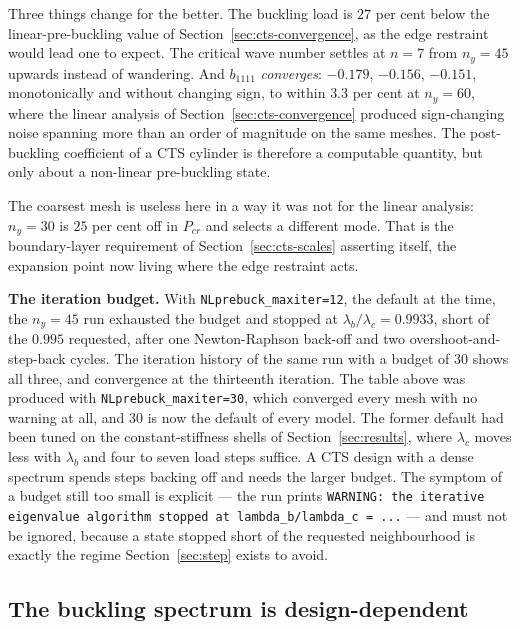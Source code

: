 \documentclass[11pt,a4paper]{article}
\begin{document}
Three things change for the better.  The buckling load is $27$ per cent below
the linear-pre-buckling value of Section~\ref{sec:cts-convergence}, as the
edge restraint would lead one to expect.  The critical wave number settles at
$n = 7$ from $n_y = 45$ upwards instead of wandering.  And $b_{1111}$
\emph{converges}: $-0.179$, $-0.156$, $-0.151$, monotonically and without
changing sign, to within $3.3$ per cent at $n_y = 60$, where the linear
analysis of Section~\ref{sec:cts-convergence} produced sign-changing noise
spanning more than an order of magnitude on the same meshes.  The post-buckling
coefficient of a CTS cylinder is therefore a computable quantity, but only
about a non-linear pre-buckling state.

The coarsest mesh is useless here in a way it was not for the linear
analysis: $n_y = 30$ is $25$ per cent off in $P_{cr}$ and selects a different
mode.  That is the boundary-layer requirement of
Section~\ref{sec:cts-scales} asserting itself, the expansion point now living
where the edge restraint acts.

\medskip
\noindent
\textbf{The iteration budget.}  With \texttt{NLprebuck\_maxiter=12}, the
default at the time, the $n_y = 45$ run exhausted the budget and
stopped at $\lambda_b/\lambda_c = 0.9933$, short of the $0.995$ requested,
after one Newton-Raphson back-off and two overshoot-and-step-back cycles.
The iteration history of the same run with a budget of $30$ shows all three,
and convergence at the thirteenth iteration.  The table above was produced
with \texttt{NLprebuck\_maxiter=30}, which
converged every mesh with no warning at all, and $30$ is now the default of
every model.  The former default had been tuned on the constant-stiffness
shells of Section~\ref{sec:results}, where $\lambda_c$ moves less with
$\lambda_b$ and four to seven load steps suffice.  A CTS design with a dense
spectrum spends steps backing off and needs the larger budget.  The symptom
of a budget still too small is explicit --- the run prints
\texttt{WARNING: the iterative eigenvalue algorithm stopped at
lambda\_b/lambda\_c = ...} --- and must not be ignored, because a state
stopped short of the requested neighbourhood is exactly the regime
Section~\ref{sec:step} exists to avoid.

\subsection{The buckling spectrum is design-dependent}
\label{sec:cts-spectrum}
\end{document}
